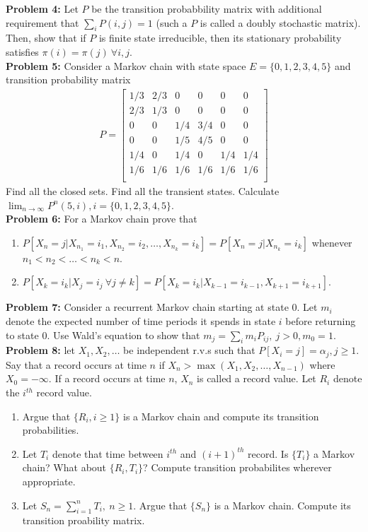 \documentclass[a4paper,11pt,english]{article}
\begin{document}
\indent \textbf{Problem 4:} Let $P$ be the transition probabbility matrix with additional requirement that $\sum_i P(i,j) = 1$ (such a $P$ is called a doubly stochastic matrix). Then, show that if $P$ is finite state irreducible, then its stationary probability satisfies $\pi(i) = \pi(j)\ \forall i,j$.\\
\indent \textbf{Problem 5:} Consider a Markov chain with state space $E = \{0,1,2,3,4,5\}$ and transition probability matrix
\begin{align*}
	P = 
\begin{bmatrix}
	1/3      & 2/3 & 0 & 0 & 0 & 0 \\
    2/3      & 1/3 & 0 & 0 & 0 & 0 \\
	0      & 0 & 1/4 & 3/4 & 0 & 0 \\
    0      & 0 & 1/5 & 4/5 & 0 & 0\\
    1/4      & 0 & 1/4 & 0 & 1/4 & 1/4 \\
    1/6      & 1/6 & 1/6 & 1/6 & 1/6 & 1/6 \\
\end{bmatrix}
\end{align*}
Find all the closed sets. Find all the transient states. Calculate $\lim_{n \rightarrow \infty} P^n(5,i), i=\{0,1,2,3,4,5\}$.
\\
\indent \textbf{Problem 6:} For a Markov chain prove that
\begin{enumerate}
\item $P[X_n = j| X_{n_1} = i_1, X_{n_2} = i_2, \dots, X_{n_k} = i_k] = P[X_n = j| X_{n_k} = i_k]$ whenever $n_1 < n_2 < \dots < n_k < n$.
\item $P[X_k = i_k| X_j = i_j\ \forall j \neq k] = P[X_k = i_k| X_{k-1} = i_{k-1}, X_{k+1} = i_{k+1}]$.
\end{enumerate} 

\indent \textbf{Problem 7:} Consider a recurrent Markov chain starting at state $0$. Let $m_i$ denote the expected number of time periods it spends in state $i$ before returning to state $0$.  Use Wald's equation to show that $m_j = \sum_i m_{i} P_{ij},\ j>0, m_0 = 1$.\\
\indent \textbf{Problem 8:} let $X_1,X_2,\dots$ be independent r.v.s such that $P[X_i = j] = \alpha_j, j\geq 1$. Say that a record occurs at time $n$ if $X_n > \max(X_1,X_2,\dots,X_{n-1})$ where $X_0 = -\infty$. If a record occurs at time $n$, $X_n$ is called a record value. Let $R_i$ denote the $i^{th}$ record value.
\begin{enumerate}
\item Argue that $\{R_i, i\geq 1\}$ is a Markov chain and compute its transition probabilities. 
\item Let $T_i$ denote that time between $i^{th}$ and $(i+1)^{th}$ record. Is $\{T_i\}$ a Markov chain? What about $\{R_i,T_i\}$? Compute transition probabilites wherever appropriate. 
\item  Let $S_n = \sum_{i=1}^{n} T_i,\  n\geq 1$. Argue that $\{S_n\}$ is a Markov chain. Compute its transition proability matrix. 
\end{enumerate}
\end{document}
